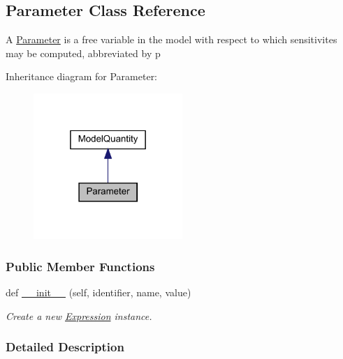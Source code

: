 \hypertarget{classamici_1_1ode__export_1_1_parameter}{}\subsection{Parameter Class Reference}
\label{classamici_1_1ode__export_1_1_parameter}


A \mbox{\hyperlink{classamici_1_1ode__export_1_1_parameter}{Parameter}} is a free variable in the model with respect to which sensitivites may be computed, abbreviated by {\ttfamily p}  




Inheritance diagram for Parameter\+:
\nopagebreak
\begin{figure}[H]
\begin{center}
\leavevmode
\includegraphics[width=160pt]{classamici_1_1ode__export_1_1_parameter__inherit__graph}
\end{center}
\end{figure}
\subsubsection*{Public Member Functions}
\begin{DoxyCompactItemize}
\item 
def \mbox{\hyperlink{classamici_1_1ode__export_1_1_parameter_a258843a3afab00b576ccf386e8673a64}{\+\_\+\+\_\+init\+\_\+\+\_\+}} (self, identifier, name, value)
\begin{DoxyCompactList}\small\item\em Create a new \mbox{\hyperlink{classamici_1_1ode__export_1_1_expression}{Expression}} instance. \end{DoxyCompactList}\end{DoxyCompactItemize}


\subsubsection{Detailed Description}


